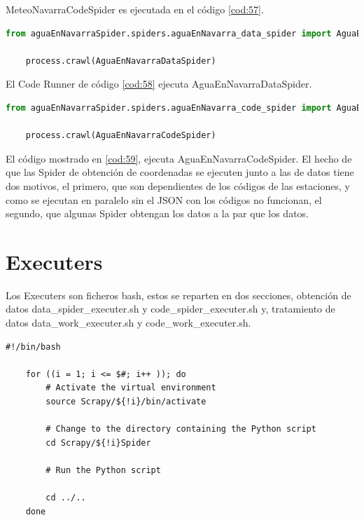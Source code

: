 MeteoNavarraCodeSpider es ejecutada en el código \ref{cod:57}.

\begin{lstlisting}[language=Python, caption={Agua en Navarra Data Runner}, label=cod:58]
	from aguaEnNavarraSpider.spiders.aguaEnNavarra_data_spider import AguaEnNavarraDataSpider
	
	process.crawl(AguaEnNavarraDataSpider)
\end{lstlisting}

El Code Runner de código \ref{cod:58} ejecuta AguaEnNavarraDataSpider.

\begin{lstlisting}[language=Python, caption={Agua en Navarra Code Runner}, label=cod:59]
	from aguaEnNavarraSpider.spiders.aguaEnNavarra_code_spider import AguaEnNavarraCodeSpider

	process.crawl(AguaEnNavarraCodeSpider)
\end{lstlisting}

El código mostrado en \ref{cod:59}, ejecuta AguaEnNavarraCodeSpider.\newline
\newline
El hecho de que las Spider de obtención de coordenadas se ejecuten junto a las de datos tiene dos motivos, el primero, que son dependientes de los códigos de las estaciones, y como se ejecutan en paralelo sin el JSON con los códigos no funcionan, el segundo, que algunas Spider obtengan los datos a la par que los datos.

\section{Executers}
Los Executers son ficheros bash, estos se reparten en dos secciones, obtención de datos data\_spider\_executer.sh y code\_spider\_executer.sh y, tratamiento de datos data\_work\_executer.sh y code\_work\_executer.sh.

\begin{lstlisting}[caption={Ejecucion de entorno virtual y selección de proyecto Scrapy}, label=cod:60]
	#!/bin/bash
	
	for ((i = 1; i <= $#; i++ )); do
		# Activate the virtual environment
		source Scrapy/${!i}/bin/activate
		
		# Change to the directory containing the Python script
		cd Scrapy/${!i}Spider
		
		# Run the Python script
		
		cd ../..
	done
\end{lstlisting}

